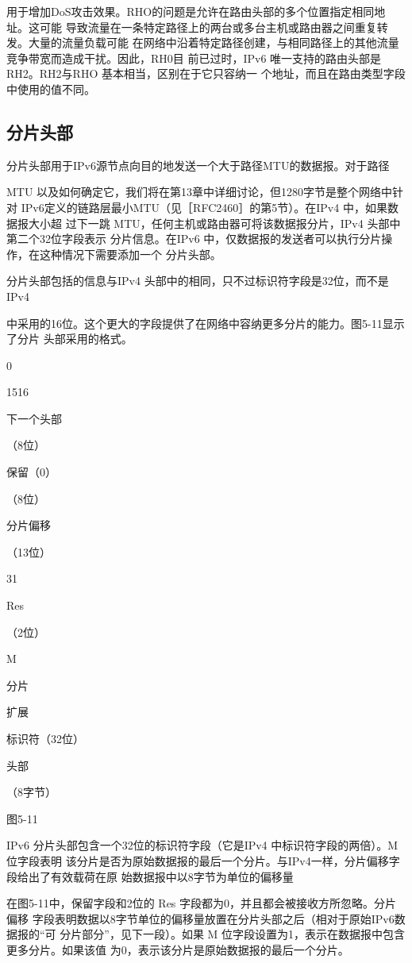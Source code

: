 用于增加DoS攻击效果。RHO的问题是允许在路由头部的多个位置指定相同地址。这可能
导致流量在一条特定路径上的两台或多台主机或路由器之间重复转发。大量的流量负载可能
在网络中沿着特定路径创建，与相同路径上的其他流量竞争带宽而造成干扰。因此，RH0目
前已过时，IPv6 唯一支持的路由头部是RH2。RH2与RHO 基本相当，区别在于它只容纳一
个地址，而且在路由类型字段中使用的值不同。

\subsection{分片头部}
分片头部用于IPv6源节点向目的地发送一个大于路径MTU的数据报。对于路径

MTU 以及如何确定它，我们将在第13章中详细讨论，但1280字节是整个网络中针对
IPv6定义的链路层最小MTU（见［RFC2460］的第5节）。在IPv4 中，如果数据报大小超
过下一跳 MTU，任何主机或路由器可将该数据报分片，IPv4 头部中第二个32位字段表示
分片信息。在IPv6 中，仅数据报的发送者可以执行分片操作，在这种情况下需要添加一个
分片头部。

分片头部包括的信息与IPv4 头部中的相同，只不过标识符字段是32位，而不是IPv4

中采用的16位。这个更大的字段提供了在网络中容纳更多分片的能力。图5-11显示了分片
头部采用的格式。

0

1516

下一个头部

（8位）

保留（0）

（8位）

分片偏移

（13位）

31

Res

（2位）

M

分片

扩展

标识符（32位）

头部

（8字节）

图5-11

IPv6 分片头部包含一个32位的标识符字段（它是IPv4 中标识符字段的两倍）。M位字段表明
该分片是否为原始数据报的最后一个分片。与IPv4一样，分片偏移字段给出了有效载荷在原
始数据报中以8字节为单位的偏移量

在图5-11中，保留字段和2位的 Res 字段都为0，并且都会被接收方所忽略。分片偏移
字段表明数据以8字节单位的偏移量放置在分片头部之后（相对于原始IPv6数据报的“可
分片部分”，见下一段）。如果 M 位字段设置为1，表示在数据报中包含更多分片。如果该值
为0，表示该分片是原始数据报的最后一个分片。

